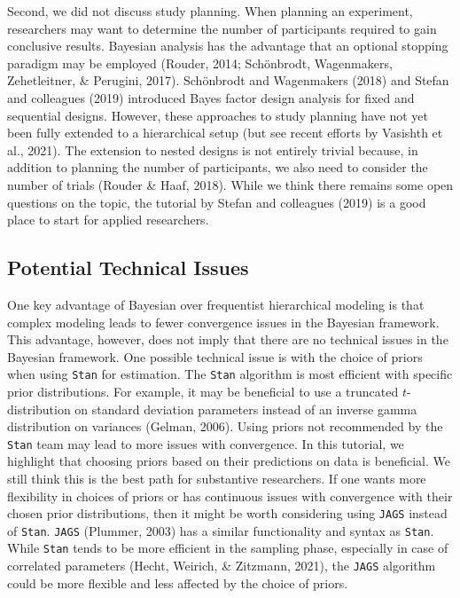 \documentclass[
  english,
  doc,floatsintext]{apa6}
\begin{document}
Second, we did not discuss study planning. When planning an experiment, researchers may want to determine the number of participants required to gain conclusive results. Bayesian analysis has the advantage that an optional stopping paradigm may be employed (Rouder, 2014; Schönbrodt, Wagenmakers, Zehetleitner, \& Perugini, 2017). Schönbrodt and Wagenmakers (2018) and Stefan and colleagues (2019) introduced Bayes factor design analysis for fixed and sequential designs. However, these approaches to study planning have not yet been fully extended to a hierarchical setup (but see recent efforts by Vasishth et al., 2021). The extension to nested designs is not entirely trivial because, in addition to planning the number of participants, we also need to consider the number of trials (Rouder \& Haaf, 2018). While we think there remains some open questions on the topic, the tutorial by Stefan and colleagues (2019) is a good place to start for applied researchers.

\hypertarget{potential-technical-issues}{%
\subsection{Potential Technical Issues}\label{potential-technical-issues}}

One key advantage of Bayesian over frequentist hierarchical modeling is that complex modeling leads to fewer convergence issues in the Bayesian framework. This advantage, however, does not imply that there are no technical issues in the Bayesian framework. One possible technical issue is with the choice of priors when using \texttt{Stan} for estimation. The \texttt{Stan} algorithm is most efficient with specific prior distributions. For example, it may be beneficial to use a truncated \(t\)-distribution on standard deviation parameters instead of an inverse gamma distribution on variances (Gelman, 2006). Using priors not recommended by the \texttt{Stan} team may lead to more issues with convergence. In this tutorial, we highlight that choosing priors based on their predictions on data is beneficial. We still think this is the best path for substantive researchers. If one wants more flexibility in choices of priors or has continuous issues with convergence with their chosen prior distributions, then it might be worth considering using \texttt{JAGS} instead of \texttt{Stan}. \texttt{JAGS} (Plummer, 2003) has a similar functionality and syntax as \texttt{Stan}. While \texttt{Stan} tends to be more efficient in the sampling phase, especially in case of correlated parameters (Hecht, Weirich, \& Zitzmann, 2021), the \texttt{JAGS} algorithm could be more flexible and less affected by the choice of priors.
\end{document}
